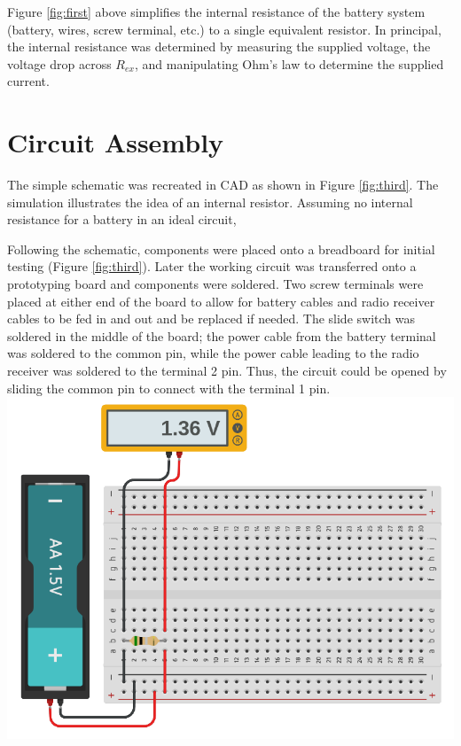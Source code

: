 \documentclass[journal]{IEEEtran}
\begin{document}
\noindent Figure \ref{fig:first} above simplifies the internal resistance of the battery system (battery, wires, screw terminal, etc.) to a single equivalent resistor. In principal, the internal resistance was determined by measuring the supplied voltage,  the voltage drop across $R_{ex}$, and manipulating Ohm's law to determine the supplied current. 


\smallskip
\section{Circuit Assembly}

\noindent The simple schematic was recreated in CAD as shown in Figure \ref{fig:third}. The simulation illustrates the idea of an internal resistor. Assuming no internal resistance for a battery in an ideal circuit, 

Following the schematic, components were placed onto a breadboard for initial testing (Figure \ref{fig:third}). Later the working circuit was transferred onto a prototyping board and components were soldered. Two screw terminals were placed at either end of the board to allow for battery cables and radio receiver cables to be fed in and out and be replaced if needed. The slide switch was soldered in the middle of the board; the power cable from the battery terminal was soldered to the common pin, while the power cable leading to the radio receiver was soldered to the terminal 2 pin. Thus, the circuit could be opened by sliding the common pin to connect with the terminal 1 pin.\\

\begingroup
    \medskip
    \centering
    \includegraphics[width=\columnwidth]{images/lab3_2.png}
    \label{fig:third}
    \medskip
\endgroup
\end{document}
